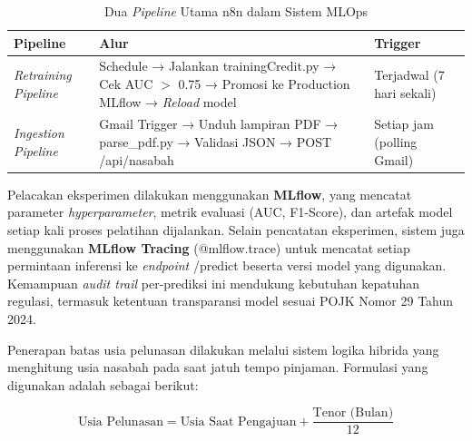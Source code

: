 \begin{table}[H]
\centering
\caption{Dua \textit{Pipeline} Utama n8n dalam Sistem MLOps}
\label{tab:n8n-pipelines}
\begin{tabularx}{\textwidth}{|p{3.5cm}|X|p{3.5cm}|}
\hline
\textbf{Pipeline} & \textbf{Alur} & \textbf{Trigger} \\ \hline
\textit{Retraining Pipeline} & Schedule → Jalankan trainingCredit.py → Cek AUC $>$ 0.75 → Promosi ke Production MLflow → \textit{Reload} model & Terjadwal (7 hari sekali) \\ \hline
\textit{Ingestion Pipeline} & Gmail Trigger → Unduh lampiran PDF → parse\_pdf.py → Validasi JSON → POST /api/nasabah & Setiap jam (polling Gmail) \\ \hline
\end{tabularx}
\end{table}

Pelacakan eksperimen dilakukan menggunakan \textbf{MLflow}, yang mencatat parameter \textit{hyperparameter}, metrik evaluasi (AUC, F1-Score), dan artefak model setiap kali proses pelatihan dijalankan. Selain pencatatan eksperimen, sistem juga menggunakan \textbf{MLflow Tracing} (@mlflow.trace) untuk mencatat setiap permintaan inferensi ke \textit{endpoint} /predict beserta versi model yang digunakan. Kemampuan \textit{audit trail} per-prediksi ini mendukung kebutuhan kepatuhan regulasi, termasuk ketentuan transparansi model sesuai POJK Nomor 29 Tahun 2024.



Penerapan batas usia pelunasan dilakukan melalui sistem logika hibrida yang menghitung usia nasabah pada saat jatuh tempo pinjaman. Formulasi yang digunakan adalah sebagai berikut:

\begin{equation}
    \text{Usia Pelunasan} = \text{Usia Saat Pengajuan} + \frac{\text{Tenor (Bulan)}}{12}
    \label{eq:usia-pelunasan}
\end{equation}


